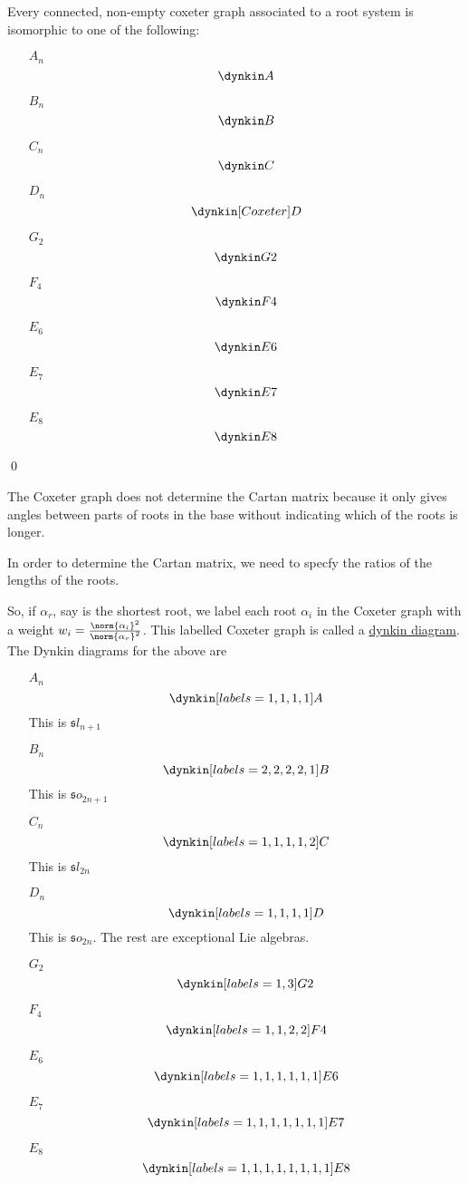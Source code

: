 \documentclass[x11names,reqno,14pt]{extarticle}
\newcommand{\mk}[1]{\mathfrak{#1}}
\begin{document}
Every connected, non-empty coxeter graph associated to a root system is isomorphic to one of the following:
\begin{itemize}
\item[$A_n$]
\[
\dynkin A{}
\]
\item[$B_n$]
\[
\dynkin B{}
\]
\item[$C_n$]
\[
\dynkin C{}
\]
\item[$D_n$]
\[
\dynkin [Coxeter]D{}
\]
\item[$G_2$]
\[
\dynkin G{2}
\]
\item[$F_4$]
\[
\dynkin F{4}
\]
\item[$E_6$]
\[
\dynkin E{6}
\]
\item[$E_7$]
\[
\dynkin E{7}
\]
\item[$E_8$]
\[
\dynkin E{8}
\]
\end{itemize}

\proof

\qed

The Coxeter graph does not determine the Cartan matrix because it only gives angles between parts of roots in the base without indicating which of the roots is longer. 

In order to determine the Cartan matrix, we need to specfy the ratios of the lengths of the roots. 

So, if $\alpha_r$, say is the shortest root, we label each root $\alpha_i$ in the Coxeter graph with a weight $w_i = \frac{\norm{\alpha_i}^2}{\norm{\alpha_r}^2}$. This labelled Coxeter graph is called a \underline{dynkin diagram}. The Dynkin diagrams for the above are

\begin{itemize}
\item[$A_n$]
\[
\dynkin[labels = {1,1,1,1}] A{}
\]
This is $\mk{s} l_{n + 1}$
\item[$B_n$]
\[
\dynkin [labels = {2,2,2,2,1}]B{}
\]
This is $\mk{s}o_{2n+1}$
\item[$C_n$]
\[
\dynkin [labels={1,1,1,1,2}]C{}
\]
This is $\mk{s}l_{2n}$
\item[$D_n$]
\[
\dynkin [labels={1,1,1,1}]D{}
\]
This is $\mk{s}o_{2n}$. The rest are exceptional Lie algebras.
\item[$G_2$]
\[
\dynkin [labels={1,3}]G{2}
\]
\item[$F_4$]
\[
\dynkin [labels={1,1,2,2}]F{4}
\]
\item[$E_6$]
\[
\dynkin [labels={1,1,1,1,1,1}]E{6}
\]
\item[$E_7$]
\[
\dynkin [labels={1,1,1,1,1,1,1}]E{7}
\]
\item[$E_8$]
\[
\dynkin [labels={1,1,1,1,1,1,1,1}] E{8}
\]
\end{itemize}
\end{document}
